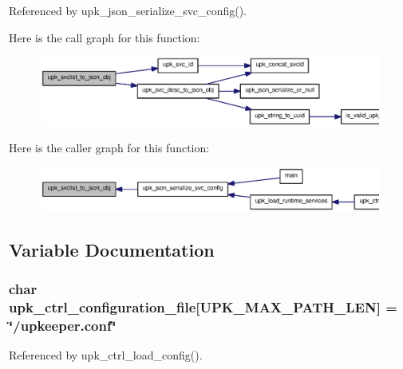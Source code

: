 Referenced by upk\_\-json\_\-serialize\_\-svc\_\-config().



Here is the call graph for this function:
\nopagebreak
\begin{figure}[H]
\begin{center}
\leavevmode
\includegraphics[width=400pt]{group__config__impl_ga82376799c5e86edd919376c308139d8b_cgraph}
\end{center}
\end{figure}




Here is the caller graph for this function:\nopagebreak
\begin{figure}[H]
\begin{center}
\leavevmode
\includegraphics[width=400pt]{group__config__impl_ga82376799c5e86edd919376c308139d8b_icgraph}
\end{center}
\end{figure}




\subsection{Variable Documentation}
\subsubsection[{upk\_\-ctrl\_\-configuration\_\-file}]{\setlength{\rightskip}{0pt plus 5cm}char {\bf upk\_\-ctrl\_\-configuration\_\-file}[UPK\_\-MAX\_\-PATH\_\-LEN] = \char`\"{}/upkeeper.conf\char`\"{}}\label{group__config__impl_ga60eaf9d484f5d0b644ff676f986debd0}


Referenced by upk\_\-ctrl\_\-load\_\-config().

